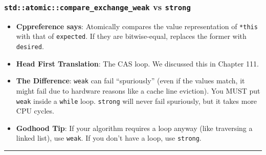 \hypertarget{stdatomiccompare_exchange_weak-vs-strong}{%
\subsubsection{\texorpdfstring{\texttt{std::atomic::compare\_exchange\_weak}
vs
\texttt{strong}}{std::atomic::compare\_exchange\_weak vs strong}}\label{stdatomiccompare_exchange_weak-vs-strong}}

\begin{itemize}
\tightlist
\item
  \textbf{Cppreference says}: Atomically compares the value
  representation of \passthrough{\lstinline!*this!} with that of
  \passthrough{\lstinline!expected!}. If they are bitwise-equal,
  replaces the former with \passthrough{\lstinline!desired!}.
\item
  \textbf{Head First Translation}: The CAS loop. We discussed this in
  Chapter 111.
\item
  \textbf{The Difference}: \passthrough{\lstinline!weak!} can fail
  ``spuriously'' (even if the values match, it might fail due to
  hardware reasons like a cache line eviction). You MUST put
  \passthrough{\lstinline!weak!} inside a
  \passthrough{\lstinline!while!} loop. \passthrough{\lstinline!strong!}
  will never fail spuriously, but it takes more CPU cycles.
\item
  \textbf{Godhood Tip}: If your algorithm requires a loop anyway (like
  traversing a linked list), use \passthrough{\lstinline!weak!}. If you
  don't have a loop, use \passthrough{\lstinline!strong!}.
\end{itemize}

\begin{center}\rule{0.5\linewidth}{0.5pt}\end{center}
